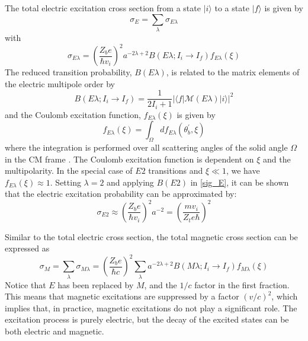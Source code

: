 \documentclass[twoside,english]{uiofysmaster/uiofysmaster}
\let\orgautoref\autoref
\renewcommand{\autoref}
        {%
		 \def\sectionautorefname{Section}%
		 \def\subsectionautorefname{Section}%
		 \def\subsubsectionautorefname{Section}%
		 \def\chapterautorefname{Chapter}%
          \orgautoref}
\begin{document}
The total electric excitation cross section from a state $|i\rangle$ to a state $|f\rangle$ is given by
\begin{equation}\label{tot_sig_E}
	\sigma_E = \sum_\lambda \sigma_{E \lambda}
\end{equation}
with
\begin{equation}\label{sig_E}
	\sigma_{E \lambda} = \left( \frac{Z_b e}{\hbar v_i} \right)^2 a^{-2 \lambda + 2} B(E \lambda; I_i \rightarrow I_f) f_{E \lambda} (\xi)
\end{equation}
The reduced transition probability, $B(E \lambda)$, is related to the matrix elements of the electric multipole order by
\begin{equation}
	B(E \lambda; I_i \rightarrow I_f) = \frac{1}{2I_i + 1} | \langle f | \mathcal{M}(E \lambda)| i \rangle |^2 
\end{equation}
and the Coulomb excitation function, $f_{E \lambda} (\xi)$ is given by
\begin{equation}
	f_{E \lambda} (\xi) = \int_\Omega df_{E \lambda} (\theta_b^{'}, \xi)
\end{equation}
where the integration is performed over all scattering angles of the solid angle $\Omega$ in the CM frame \cite{Niedermaier, EE-Coulex}.
The Coulomb excitation function is dependent on $\xi$ and the multipolarity. 
In the special case of $E2$ transitions and $\xi \ll 1$, we have $f_{E \lambda} (\xi) \approx 1$.
Setting $\lambda = 2$ and applying $B(E2)$ in \autoref{sig_E}, it can be shown that the electric excitation probability \cite{NaR} can be approximated by: 
\begin{equation}
	\sigma_{E2} \approx \left( \frac{Z_b e}{\hbar v_i} \right)^2 a^{-2} = \left( \frac{mv_i}{Z_t e\hbar} \right)^2
\end{equation}

Similar to the total electric cross section, the total magnetic cross section can be expressed as \cite{EE-Coulex}
\begin{equation}
	\sigma_M = \sum_\lambda \sigma_{M \lambda} = \left( \frac{Z_b e}{\hbar c} \right)^2 \sum_\lambda a^{-2 \lambda + 2} B(M \lambda; I_i \rightarrow I_f) f_{M \lambda} (\xi)
\end{equation}
Notice that $E$ has been replaced by $M$, and the $1/c$ factor in the first fraction.
This means that magnetic excitations are suppressed by a factor $(v/c)^2$, which implies that, in practice, magnetic excitations do not play a significant role.
The excitation process is purely electric, but the decay of the excited states can be both electric and magnetic.
\end{document}
